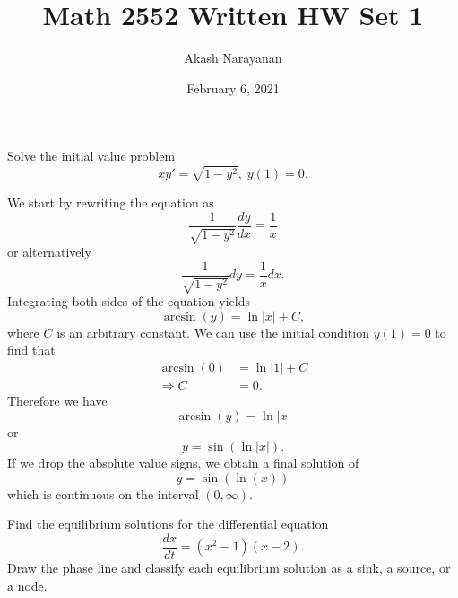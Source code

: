 \documentclass[11pt]{article}
\title{Math 2552 Written HW Set 1}
\author{Akash Narayanan}
\date{February 6, 2021}
\begin{document}
  \maketitle

  \begin{problem}[Problem 1.2.17]
    Solve the initial value problem
    \begin{equation*}
      xy' = \sqrt{1-y^{2}}, \; y(1) = 0.
    \end{equation*}
  \end{problem}

  \begin{solution}
    We start by rewriting the equation as
    \begin{equation*}
      \frac{1}{\sqrt{1-y^{2}}} \frac{dy}{dx} = \frac{1}{x}
    \end{equation*}
    or alternatively
    \begin{equation*}
      \frac{1}{\sqrt{1-y^{2}}} dy = \frac{1}{x} dx.
    \end{equation*}
    Integrating both sides of the equation yields
    \begin{equation*}
      \arcsin(y) = \ln|x| + C,
    \end{equation*}
    where \(C\) is an arbitrary constant.
    We can use the initial condition \(y(1) = 0\) to find that
    \begin{align*}
      \arcsin(0) &= \ln|1| + C \\
      \Longrightarrow C &= 0.
    \end{align*}
    Therefore we have
    \begin{equation*}
      \arcsin(y) = \ln|x|
    \end{equation*}
    or
    \begin{equation*}
      y = \sin(\ln|x|).
    \end{equation*}
    If we drop the absolute value signs, we obtain a final solution of
    \begin{equation*}
      y = \sin(\ln(x))
    \end{equation*}
    which is continuous on the interval \((0, \infty)\).
  \end{solution}

  \pagebreak

  \begin{problem}[Problem 1.3.10]
    Find the equilibrium solutions for the differential equation
    \begin{equation*}
      \frac{dx}{dt} = (x^{2} - 1) (x - 2).
    \end{equation*}
    Draw the phase line and classify each equilibrium solution as a sink, a source, or a node.
  \end{problem}
\end{document}
